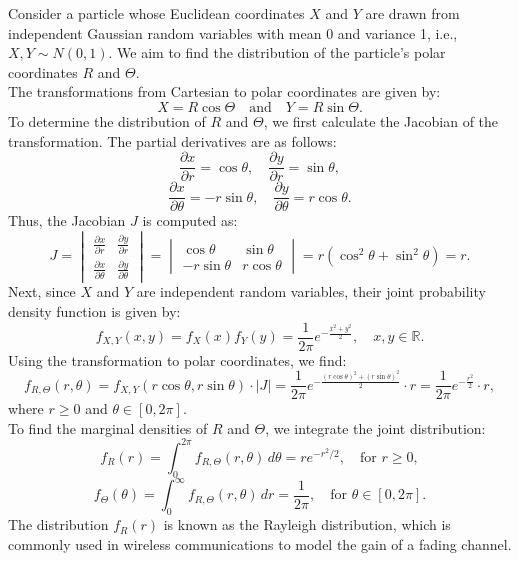 \begin{example}
Consider a particle whose Euclidean coordinates \(X\) and \(Y\) are drawn from independent Gaussian random variables with mean 0 and variance 1, i.e., \(X, Y \sim N(0, 1)\). We aim to find the distribution of the particle's polar coordinates \(R\) and \(\Theta\). \\

The transformations from Cartesian to polar coordinates are given by:
\[
X = R \cos \Theta \quad \text{and} \quad Y = R \sin \Theta.
\]
To determine the distribution of \(R\) and \(\Theta\), we first calculate the Jacobian of the transformation. The partial derivatives are as follows:
\[
\frac{\partial x}{\partial r} = \cos \theta, \quad \frac{\partial y}{\partial r} = \sin \theta,
\]
\[
\frac{\partial x}{\partial \theta} = -r \sin \theta, \quad \frac{\partial y}{\partial \theta} = r \cos \theta.
\]
Thus, the Jacobian \(J\) is computed as:
\[
J = \begin{vmatrix}
\frac{\partial x}{\partial r} & \frac{\partial y}{\partial r} \\
\frac{\partial x}{\partial \theta} & \frac{\partial y}{\partial \theta}
\end{vmatrix} = \begin{vmatrix}
\cos \theta & \sin \theta \\
-r \sin \theta & r \cos \theta
\end{vmatrix} = r(\cos^2 \theta + \sin^2 \theta) = r.
\]
Next, since \(X\) and \(Y\) are independent random variables, their joint probability density function is given by:
\[
f_{X,Y}(x, y) = f_X(x) f_Y(y) = \frac{1}{2\pi} e^{-\frac{x^2 + y^2}{2}}, \quad x, y \in \mathbb{R}.
\]
Using the transformation to polar coordinates, we find:
\[
f_{R,\Theta}(r, \theta) = f_{X,Y}(r \cos \theta, r \sin \theta) \cdot |J| = \frac{1}{2\pi} e^{-\frac{(r \cos \theta)^2 + (r \sin \theta)^2}{2}} \cdot r = \frac{1}{2\pi} e^{-\frac{r^2}{2}} \cdot r,
\]
where \(r \geq 0\) and \(\theta \in [0, 2\pi]\).\\

To find the marginal densities of \(R\) and \(\Theta\), we integrate the joint distribution:
\[
f_R(r) = \int_0^{2\pi} f_{R,\Theta}(r, \theta) \, d\theta = r e^{-r^2/2}, \quad \text{for } r \geq 0,
\]
\[
f_\Theta(\theta) = \int_0^\infty f_{R,\Theta}(r, \theta) \, dr = \frac{1}{2\pi}, \quad \text{for } \theta \in [0, 2\pi].
\]
The distribution \(f_R(r)\) is known as the Rayleigh distribution, which is commonly used in wireless communications to model the gain of a fading channel. 
\end{example}

